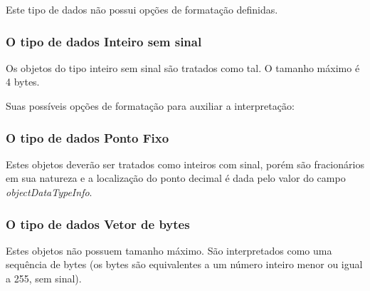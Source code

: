 Este tipo de dados não possui opções de formatação definidas.

\subsubsection*{O tipo de dados Inteiro sem sinal}

Os objetos do tipo inteiro sem sinal são tratados como tal. O tamanho máximo é 4 bytes.

Suas possíveis opções de formatação para auxiliar a interpretação:


\begin{table}[H]
\centering
\caption{Formatação dos objetos do tipo inteiro sem sinal}
\end{table}


\subsubsection*{O tipo de dados Ponto Fixo}

Estes objetos deverão ser tratados como inteiros com sinal, porém são fracionários em sua natureza e a localização do ponto decimal é dada pelo valor do campo \textit{objectDataTypeInfo}.

\subsubsection*{O tipo de dados Vetor de bytes}

Estes objetos não possuem tamanho máximo. São interpretados como uma sequência de bytes (os bytes são equivalentes a um número inteiro menor ou igual a 255, sem sinal).

